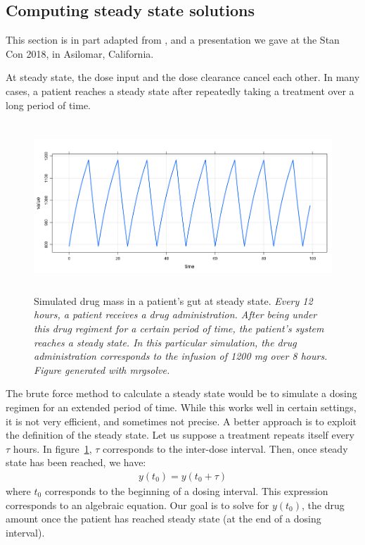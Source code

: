 \documentclass[11pt]{article}
\begin{document}
\subsection{Computing steady state solutions} \label{steadyStates}

This section is in part adapted from \cite{Margossian:2018}, and a 
presentation we gave at the Stan Con 2018, in Asilomar, California.

At steady state, the dose input and the dose clearance cancel each other.
In many cases, a patient reaches a steady state after repeatedly taking a treatment
over a long period of time.

\begin{figure}[!htb]
\begin{center}
\includegraphics[width = 5in, height = 2.5in, trim=0in 0in 0 0in]{graphics/SS.png}
\caption{Simulated drug mass in a patient's gut at steady state. \textit{Every 12 hours, a patient
receives a drug administration. After being under this drug regiment for a certain period of time, 
the patient's system reaches a steady state. In this particular simulation, the drug administration
corresponds to the infusion of 1200 mg over 8 hours. Figure generated with mrgsolve.}}
\label{fig:steadyState}
\end{center}
\end{figure}

The brute force method to calculate a steady state would be to simulate a dosing regimen
for an extended period of time. While this works well in certain settings, it is not very efficient,
and sometimes not precise. A better approach is to exploit the definition of the steady state.
Let us suppose a treatment repeats itself every $\tau$ hours. In figure~\ref{fig:steadyState},
$\tau$ corresponds to the inter-dose interval. Then, once steady state has been reached,
we have:
%
\begin{eqnarray}
y(t_0) = y(t_0 + \tau)
\end{eqnarray}
%
where $t_0$ corresponds to the beginning of a dosing interval. This expression corresponds 
to an algebraic equation. Our goal is to solve for $y(t_0)$, the drug amount once the
patient has reached steady state (at the end of a dosing interval).
\end{document}
